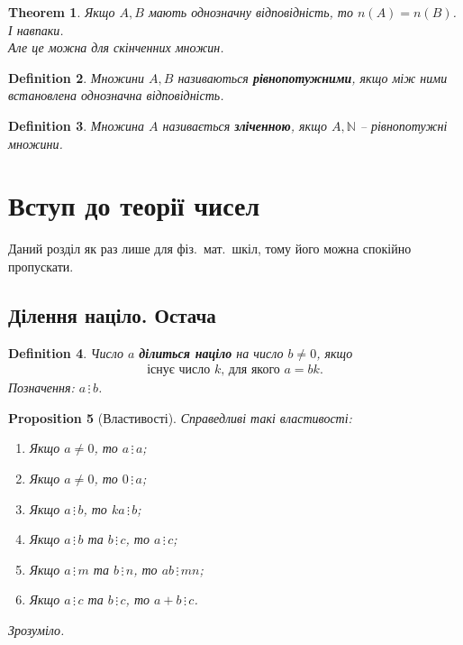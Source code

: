 \documentclass[a4paper, 10pt]{article}
\theoremstyle{theoremdd}
\newtheorem{theorem}{Theorem}[subsection]
\theoremstyle{theoremdd}
\newtheorem{definition}[theorem]{Definition}
\theoremstyle{theoremdd}
\theoremstyle{theoremdd}
\theoremstyle{theoremdd}
\newtheorem{proposition}[theorem]{Proposition}
\theoremstyle{theoremdd}
\theoremstyle{theoremdd}
\theoremstyle{theoremdd}
\newcommand\divisibleBy{\, \vdots \,}
\begin{document}
\begin{theorem}
Якщо $A,B$ мають однозначну відповідність, то $n(A) = n(B)$. І навпаки.\\
Але це можна для скінченних множин.
\end{theorem}

\begin{definition}
Множини $A,B$ називаються \textbf{рівнопотужними}, якщо між ними встановлена однозначна відповідність.
\end{definition}

\begin{definition}
Множина $A$ називається \textbf{зліченною}, якщо $A,\mathbb{N}$ -- рівнопотужні множини.
\end{definition}
\newpage

\section{Вступ до теорії чисел}
Даний розділ як раз лише для фіз.\ мат.\ шкіл, тому його можна спокійно пропускати.
\subsection{Ділення націло. Остача}
\begin{definition}
Число $a$ \textbf{ділиться націло} на число $b \neq 0$, якщо
\begin{align*}
\text{існує число $k$, для якого $a = bk$.}
\end{align*}
Позначення: $a \divisibleBy b$.
\end{definition}

\begin{proposition}[Властивості]
Справедливі такі властивості:
\begin{enumerate}[nosep,wide=0pt,label={\arabic*)}]
\item Якщо $a \neq 0$, то $a \divisibleBy a$;
\item Якщо $a \neq 0$, то $0 \divisibleBy a$;
\item Якщо $a \divisibleBy b$, то $ka \divisibleBy b$;
\item Якщо $a \divisibleBy b$ та $b \divisibleBy c$, то $a \divisibleBy c$;
\item Якщо $a \divisibleBy m$ та $b \divisibleBy n$, то $ab \divisibleBy mn$;
\item Якщо $a \divisibleBy c$ та $b \divisibleBy c$, то $a+b \divisibleBy c$.
\end{enumerate}
\textit{Зрозуміло.}
\end{proposition}
\end{document}
